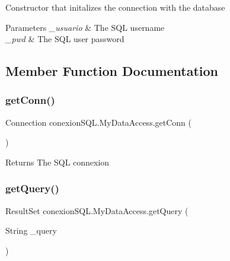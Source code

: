 Constructor that initalizes the connection with the database 
\begin{DoxyParams}{Parameters}
{\em \+\_\+usuario} & The S\+QL username \\
\hline
{\em \+\_\+pwd} & The S\+QL user password \\
\hline
\end{DoxyParams}


\subsection{Member Function Documentation}
\mbox{\label{classconexion_s_q_l_1_1_my_data_access_a3317cee8cca3bea96e915daf445e068d}} 
\subsubsection{\texorpdfstring{get\+Conn()}{getConn()}}
{\footnotesize\ttfamily Connection conexion\+S\+Q\+L.\+My\+Data\+Access.\+get\+Conn (\begin{DoxyParamCaption}{ }\end{DoxyParamCaption})}

\begin{DoxyReturn}{Returns}
The S\+QL connexion 
\end{DoxyReturn}
\mbox{\label{classconexion_s_q_l_1_1_my_data_access_ae8d04039a000d2b3e7dc72c99be7c551}} 
\subsubsection{\texorpdfstring{get\+Query()}{getQuery()}}
{\footnotesize\ttfamily Result\+Set conexion\+S\+Q\+L.\+My\+Data\+Access.\+get\+Query (\begin{DoxyParamCaption}\item[{String}]{\+\_\+query }\end{DoxyParamCaption})}

